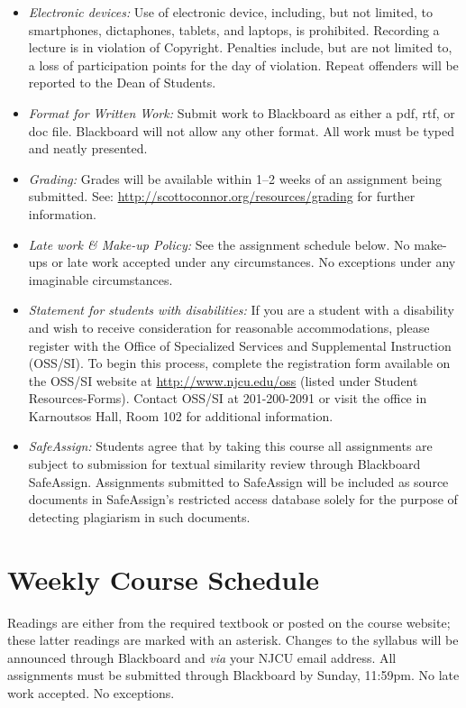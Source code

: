 \documentclass[article,oneside]{memoir}
\begin{document}
\begin{itemize}
\item \textit{Electronic devices:} Use of electronic device, including, but not limited, to smartphones, dictaphones, tablets, and laptops, is prohibited. Recording a lecture is in violation of Copyright. Penalties include, but are not limited to, a loss of participation points for the day of violation. Repeat offenders will be reported to the Dean of Students.

\item \textit{Format for Written Work:} Submit work to Blackboard as either a pdf, rtf, or doc file. Blackboard will not allow any other format. All work must be typed and neatly presented. 


\item \textit{Grading:} Grades will be available within 1--2 weeks of an assignment being submitted. See: \href{http://scottoconnor.org/resources/grading}{http://scottoconnor.org/resources/grading} for further information.


\item \textit{Late work \& Make-up Policy:} See the assignment schedule below. No make-ups or late work accepted under any circumstances. No exceptions under any imaginable circumstances.

\item \textit{Statement for students with disabilities:} If you are a student
with a disability and wish to receive consideration for reasonable
accommodations, please register with the Office of Specialized Services
and Supplemental Instruction (OSS/SI). To begin this process, complete
the registration form available on the OSS/SI website at
\href{http://www.njcu.edu/oss}{http://www.njcu.edu/oss}
(listed under Student Resources-Forms). Contact OSS/SI at 201-200-2091
or visit the office in Karnoutsos Hall, Room 102 for additional
information.
 

\item \textit{SafeAssign:} Students agree that by taking this course all assignments are subject to submission for textual similarity review through Blackboard SafeAssign. Assignments submitted to SafeAssign will be included as source documents in SafeAssign's restricted access database solely for the purpose of detecting plagiarism in such documents.  


\end{itemize}





\section{Weekly Course Schedule}
Readings are either from the required textbook or posted on the course website; these latter readings are marked with an asterisk. Changes to the syllabus will be announced through Blackboard and \emph{via} your NJCU email address.  All assignments must be submitted through Blackboard by Sunday, 11:59pm. No late work accepted. No exceptions.  
\end{document}
